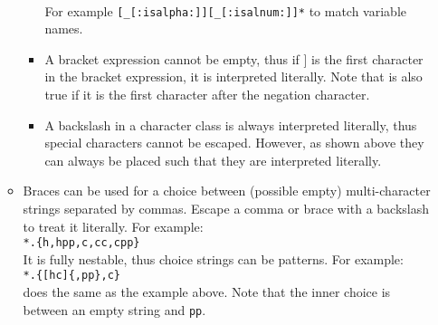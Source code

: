 \begin{itemize}
\begin{itemize}
\begin{itemize}
      \\For example
      \texttt{[\_[:isalpha:]][\_[:isalnum:]]*} to match variable names.
    \item A bracket expression cannot be empty, thus if ] is the first
      character in the bracket expression, it is interpreted
      literally. Note that is also true if it is the first character
      after the negation character.
    \item A backslash in a character class is always interpreted
      literally, thus special characters cannot be escaped.
      However, as shown above they can always be placed such
      that they are interpreted literally.
    \end{itemize}
  \item Braces can be used for a choice between (possible empty)
    multi-character strings separated by commas.
    Escape a comma or brace with a backslash to treat it literally.
    For example:
    \\\texttt{*.\{h,hpp,c,cc,cpp\}}
    \\It is fully nestable, thus choice strings can be patterns. For example:
    \\\texttt{*.\{[hc]\{,pp\},c\}}
    \\does the same as the example above. Note that the inner choice
    is between an empty string and \texttt{pp}.
  \end{itemize}


\end{itemize}
